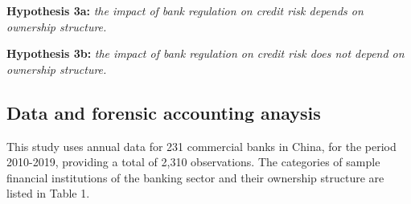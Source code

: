 \documentclass{article}
\begin{document}
\textbf{Hypothesis 3a:} \emph{the impact of bank regulation on credit
risk depends on ownership structure.}

\textbf{Hypothesis 3b:} \emph{the impact of bank regulation on credit
risk does not depend on ownership structure.}

\hypertarget{data-and-forensic-accounting-anaysis}{%
\subsection{Data and forensic accounting
anaysis}\label{data-and-forensic-accounting-anaysis}}

This study uses annual data for 231 commercial banks in China, for the
period 2010-2019, providing a total of 2,310 observations. The
categories of sample financial institutions of the banking sector and
their ownership structure are listed in Table 1.

\providecommand{\docline}[3]{\noalign{\global\setlength{\arrayrulewidth}{#1}}\arrayrulecolor[HTML]{#2}\cline{#3}}

\setlength{\tabcolsep}{2pt}

\renewcommand*{\arraystretch}{1.5}
\end{document}
